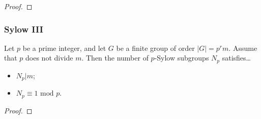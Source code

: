 \begin{proof}

\end{proof}

\subsubsection{Sylow III}\label{sylow3}

\begin{theorem}
\label{sylowthm3}
Let $p$ be a prime integer, and let $G$ be a finite group of order $|G| = p^rm$. Assume that $p$ does not divide $m$. Then the number of $p$-Sylow subgroups $N_p$ satisfies\dots
\begin{itemize}
  \item $N_p | m$;
  \item $N_p \equiv 1 \textrm{ mod } p$.
\end{itemize}
\end{theorem}

\begin{proof}

\end{proof}